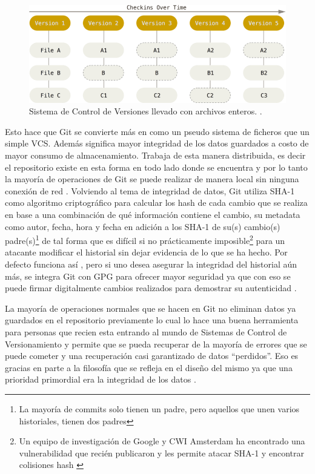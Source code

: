 \begin{figure}
  \begin{center}
      \includegraphics[width=\textwidth]{Figures/vcs-backup.png}
  \end{center}
  \caption{Sistema de Control de Versiones  llevado con archivos enteros. \citep{PROGIT-Git-Intro}.}
  \label{VCS-Backup}
\end{figure}

Esto hace que Git se convierte más en como un pseudo sistema de ficheros que un simple VCS. Además significa mayor integridad de los datos guardados a costo de mayor consumo de almacenamiento. Trabaja de esta manera distribuida, es decir el repositorio existe en esta forma en todo lado donde se encuentra y por lo tanto la mayoría de operaciones de Git se puede realizar de manera local sin ninguna conexión de red \citep{PROGIT-Git-Intro}.
Volviendo al tema de integridad de datos, Git utiliza SHA-1 como algoritmo criptográfico para calcular los hash de cada cambio que se realiza en base a una combinación de qué información contiene el cambio, su metadata como autor, fecha, hora y fecha en adición a los SHA-1 de su(s) cambio(s) padre(s)\footnote{La mayoría de commits solo tienen un padre, pero aquellos que unen varios historiales, tienen dos padres} de tal forma que es difícil si no prácticamente imposible\footnote{Un equipo de investigación de Google y CWI Amsterdam ha encontrado una vulnerabilidad que recién publicaron y les permite atacar SHA-1 y encontrar colisiones hash \citep{Shattered-Paper}} para un atacante modificar el historial sin dejar evidencia de lo que se ha hecho. Por defecto funciona así \citep{PROGIT-Git-Intro}, pero si uno desea asegurar la integridad del historial aún más, se integra Git con GPG para ofrecer mayor seguridad ya que con eso se puede firmar digitalmente cambios realizados para demostrar su autenticidad \citep{PROGIT-Git-GPG}.

La mayoría de operaciones normales  que se hacen en Git no eliminan datos ya guardados en el repositorio previamente lo cual lo hace una buena herramienta para personas que recien esta entrando al mundo de Sistemas de Control de Versionamiento y permite que se pueda recuperar de la mayoría de errores que se puede cometer y una recuperación casi garantizado de datos “perdidos”. Eso es gracias en parte a la filosofía que se refleja en el diseño del mismo ya que una prioridad primordial era la integridad de los datos \citep{PROGIT-Git-Intro}.

